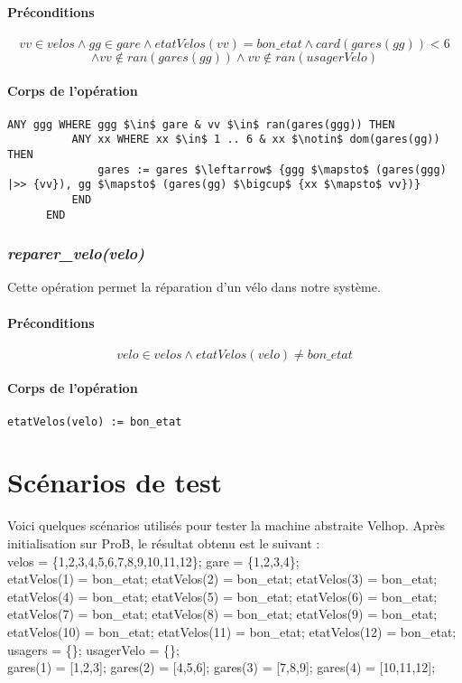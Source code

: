 \documentclass[12pt]{article}
\begin{document}
\paragraph{Préconditions}
\[ vv \in velos \land gg \in gare \land etatVelos(vv) = bon\_etat \land card(gares(gg))<6 \]
\[\land vv \notin ran(gares(gg)) \land vv \notin ran(usagerVelo)\]
\paragraph{Corps de l'opération}
\textbf{}
\begin{lstlisting}[mathescape]
      ANY ggg WHERE ggg $\in$ gare & vv $\in$ ran(gares(ggg)) THEN
          ANY xx WHERE xx $\in$ 1 .. 6 & xx $\notin$ dom(gares(gg)) THEN
              gares := gares $\leftarrow$ {ggg $\mapsto$ (gares(ggg) |>> {vv}), gg $\mapsto$ (gares(gg) $\bigcup$ {xx $\mapsto$ vv})}
          END
      END
\end{lstlisting}

\subsubsection{\textit{reparer\_velo(velo)}}
Cette opération permet la réparation d'un vélo dans notre système.
\paragraph{Préconditions}
\[ velo \in velos \land etatVelos(velo) \neq bon\_etat \]
\paragraph{Corps de l'opération}
\textbf{}
\begin{lstlisting}[mathescape]
  etatVelos(velo) := bon_etat
\end{lstlisting}
\newpage
\section{Scénarios de test}
Voici quelques scénarios utilisés pour tester la machine abstraite Velhop. Après initialisation sur ProB, le résultat obtenu est le suivant : \\
velos = \{1,2,3,4,5,6,7,8,9,10,11,12\};
gare = \{1,2,3,4\}; \\
etatVelos(1) = bon\_etat;
etatVelos(2) = bon\_etat;
etatVelos(3) = bon\_etat;
etatVelos(4) = bon\_etat;
etatVelos(5) = bon\_etat;
etatVelos(6) = bon\_etat;
etatVelos(7) = bon\_etat;
etatVelos(8) = bon\_etat;
etatVelos(9) = bon\_etat;
etatVelos(10) = bon\_etat;
etatVelos(11) = bon\_etat;
etatVelos(12) = bon\_etat;  \\
usagers = \{\};
usagerVelo = \{\}; \\
gares(1) = [1,2,3];
gares(2) = [4,5,6];
gares(3) = [7,8,9];
gares(4) = [10,11,12];
\end{document}
